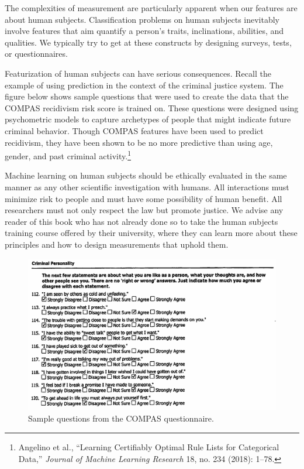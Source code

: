 \documentclass{tufte-book}
\begin{document}
The complexities of measurement are particularly apparent when our
features are about human subjects. Classification problems on human
subjects inevitably involve features that aim quantify a person's
traits, inclinations, abilities, and qualities. We typically try to get
at these constructs by designing surveys, tests, or questionnaires.

Featurization of human subjects can have serious consequences. Recall
the example of using prediction in the context of the criminal justice
system. The figure below shows sample questions that were used to create
the data that the COMPAS recidivism risk score is trained on. These
questions were designed using psychometric models to capture archetypes
of people that might indicate future criminal behavior. Though COMPAS
features have been used to predict recidivism, they have been shown to
be no more predictive than using age, gender, and past criminal
activity.\footnote{Angelino et al., {``Learning Certifiably Optimal Rule
  Lists for Categorical Data,''} \emph{Journal of Machine Learning
  Research} 18, no. 234 (2018): 1--78.}

Machine learning on human subjects should be ethically evaluated in the
same manner as any other scientific investigation with humans. All
interactions must minimize risk to people and must have some possibility
of human benefit. All researchers must not only respect the law but
promote justice. We advise any reader of this book who has not already
done so to take the human subjects training course offered by their
university, where they can learn more about these principles and how to
design measurements that uphold them.

\begin{figure}
\centering
\includegraphics[width=1\textwidth,height=\textheight]{assets/COMPAS.png}
\caption{Sample questions from the COMPAS questionnaire.}
\end{figure}
\end{document}
